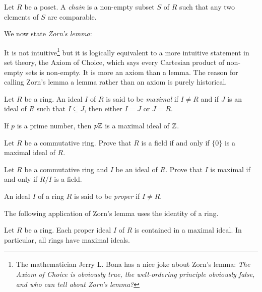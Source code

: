 \begin{definition}
    Let $R$ be a poset. A \emph{chain} is a non-empty subset $S$ of $R$ such that
    any two elements of $S$ are comparable. 
\end{definition}

We now state \emph{Zorn's lemma}:

\begin{quote}
\end{quote}

It is not intuitive\footnote{The mathematician
Jerry L. Bona has a nice joke about Zorn's lemma: 
\textit{The Axiom of Choice is obviously true, 
the well-ordering principle obviously false, and who can tell about Zorn's lemma?}}
but it is logically equivalent to a more 
intuitive statement in set theory, the Axiom of Choice, 
which says every Cartesian product of non-empty sets is non-empty. 
It is more an axiom than a lemma. 
The reason for calling Zorn’s lemma a lemma rather 
than an axiom is purely historical. 

\begin{definition}
	Let $R$ be a ring. An ideal $I$ of $R$ is said to be \emph{maximal}
	if $I\ne R$ and if $J$ is an ideal of $R$ such that $I\subseteq J$, then 
	either $I=J$ or $J=R$. 
\end{definition}

If $p$ is a prime number, then $p\mathbb{Z}$ is a maximal ideal of $\mathbb{Z}$.

\begin{exercise}
Let $R$ be a commutative ring. Prove that $R$ is a 
field if and only if $\{0\}$ is a maximal ideal of $R$. 	
\end{exercise}

\begin{exercise}
\label{xca:maximal<=>field}
Let $R$ be a commutative ring and $I$ be an ideal of $R$. Prove that $I$ is maximal
if and only if $R/I$ is a field.  	
\end{exercise}

An ideal $I$ of a ring $R$ is said to be \emph{proper}
if $I\ne R$. 

The following application of Zorn's lemma uses 
the identity of a ring.

\begin{theorem}[Krull]
	Let $R$ be a ring. Each proper ideal $I$ of $R$ 
	is contained in a maximal ideal. 
	In particular, all rings have maximal ideals. 	
\end{theorem}

